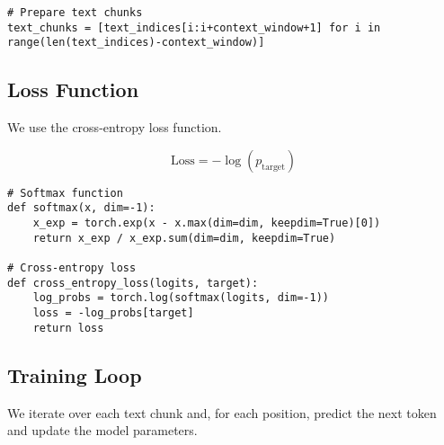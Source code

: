 \documentclass{article}
\begin{document}
\begin{lstlisting}[style=pythonstyle]
# Prepare text chunks
text_chunks = [text_indices[i:i+context_window+1] for i in range(len(text_indices)-context_window)]
\end{lstlisting}

\subsection{Loss Function}

We use the cross-entropy loss function.

\begin{equation}
\text{Loss} = -\log(p_{\text{target}})
\end{equation}

\begin{lstlisting}[style=pythonstyle]
# Softmax function
def softmax(x, dim=-1):
    x_exp = torch.exp(x - x.max(dim=dim, keepdim=True)[0])
    return x_exp / x_exp.sum(dim=dim, keepdim=True)

# Cross-entropy loss
def cross_entropy_loss(logits, target):
    log_probs = torch.log(softmax(logits, dim=-1))
    loss = -log_probs[target]
    return loss
\end{lstlisting}

\subsection{Training Loop}

We iterate over each text chunk and, for each position, predict the next token and update the model parameters.
\end{document}
